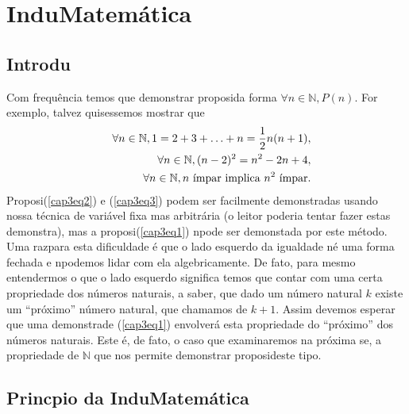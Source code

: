 \chapter{Indu\cao Matem\'atica}

\section{Introdu\cao}\label{cap3introd}

Com frequ\^encia temos que demonstrar proposi\coes da forma $\forall n\in\mathbb{N}, P(n)$. For exemplo, talvez quisessemos mostrar que
\begin{eqnarray}
&& \forall n\in\mathbb{N}, 1=2+3+\ldots+n=\frac{1}{2}n(n+1),\label{cap3eq1}\\
&& \forall n\in\mathbb{N}, (n-2)^2=n^2-2n+4,\label{cap3eq2}\\
&& \forall n\in\mathbb{N}, n \textrm{ \ih mpar implica } n^2 \textrm{ \ih mpar}. \label{cap3eq3}
\end{eqnarray}
Proposi\coes (\ref{cap3eq2}) e (\ref{cap3eq3}) podem ser facilmente demonstradas usando nossa t\'ecnica de vari\'avel fixa mas arbitr\'aria (o leitor poderia tentar fazer estas demonstra\cois), mas a proposi\cao (\ref{cap3eq1}) n\ao pode ser demonstada por este m\'etodo. Uma raz\ao para esta dificuldade \'e que o lado esquerdo da igualdade n\ao \'e uma forma fechada e n\ao podemos lidar com ela algebricamente. De fato, para mesmo entendermos o que o lado esquerdo significa temos que contar com uma certa propriedade dos n\'umeros naturais, a saber, que dado um n\'umero natural $k$ existe um ``pr\'oximo'' n\'umero natural, que chamamos de $k+1$. Assim devemos esperar que uma demonstra\cao de (\ref{cap3eq1}) envolver\'a esta propriedade do ``pr\'oximo'' dos n\'umeros naturais. Este \'e, de fato, o caso que examinaremos na pr\'oxima se\caoi, a propriedade de $\mathbb{N}$ que nos permite demonstrar proposi\coes deste tipo.

\section{Princ\ih pio da Indu\cao Matem\'atica}\label{inducao}


